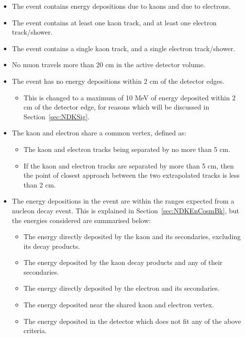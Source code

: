 \begin{itemize}
\item The event contains energy depositions due to kaons and due to electrons.
\item The event contains at least one kaon track, and at least one electron track/shower.
\item The event contains a single kaon track, and a single electron track/shower.
\item No muon travels more than 20 cm in the active detector volume.
\item The event has no energy depositions within 2 cm of the detector edges.
  \begin{itemize}
  \item This is changed to a maximum of 10 MeV of energy deposited within 2 cm of the detector edge, for reasons which will be discussed in Section~\ref{sec:NDKSig}.
  \end{itemize}
\item The kaon and electron share a common vertex, defined as:
  \begin{itemize}
  \item The kaon and electron tracks being separated by no more than 5 cm.
  \item If the kaon and electron tracks are separated by more than 5 cm, then the point of closest approach between the two extrapolated tracks is less than 2 cm.
  \end{itemize}
\item The energy depositions in the event are within the ranges expected from a nucleon decay event. This is explained in Section~\ref{sec:NDKEnCosmBk}, but the energies considered are summarised below:
  \begin{itemize}
  \item The energy directly deposited by the kaon and its secondaries, excluding its decay products.
  \item The energy deposited by the kaon decay products and any of their secondaries.
  \item The energy directly deposited by the electron and its secondaries.
  \item The energy deposited near the shared kaon and electron vertex.
  \item The energy deposited in the detector which does not fit any of the above criteria.
  \end{itemize}
\end{itemize}

